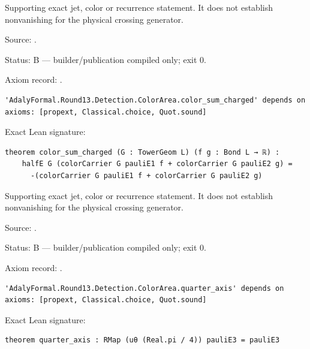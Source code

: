 \begin{theorem}[bp-528]
\label{bp-528}
\leanok
Supporting exact jet, color or recurrence statement. It does not establish nonvanishing for the physical crossing generator.

\par Source: \texttt{}.
\par Status: B — builder/publication compiled only; exit 0.
\par Axiom record: \texttt{}.
\begin{verbatim}
'AdalyFormal.Round13.Detection.ColorArea.color_sum_charged' depends on axioms: [propext, Classical.choice, Quot.sound]
\end{verbatim}
\par Exact Lean signature:
\begin{verbatim}
theorem color_sum_charged (G : TowerGeom L) (f g : Bond L → ℝ) :
    halfE G (colorCarrier G pauliE1 f + colorCarrier G pauliE2 g) =
      -(colorCarrier G pauliE1 f + colorCarrier G pauliE2 g)
\end{verbatim}
\end{theorem}

\begin{theorem}[bp-529]
\label{bp-529}
\uses{}
\leanok
Supporting exact jet, color or recurrence statement. It does not establish nonvanishing for the physical crossing generator.

\par Source: \texttt{}.
\par Status: B — builder/publication compiled only; exit 0.
\par Axiom record: \texttt{}.
\begin{verbatim}
'AdalyFormal.Round13.Detection.ColorArea.quarter_axis' depends on axioms: [propext, Classical.choice, Quot.sound]
\end{verbatim}
\par Exact Lean signature:
\begin{verbatim}
theorem quarter_axis : RMap (uθ (Real.pi / 4)) pauliE3 = pauliE3
\end{verbatim}
\end{theorem}

